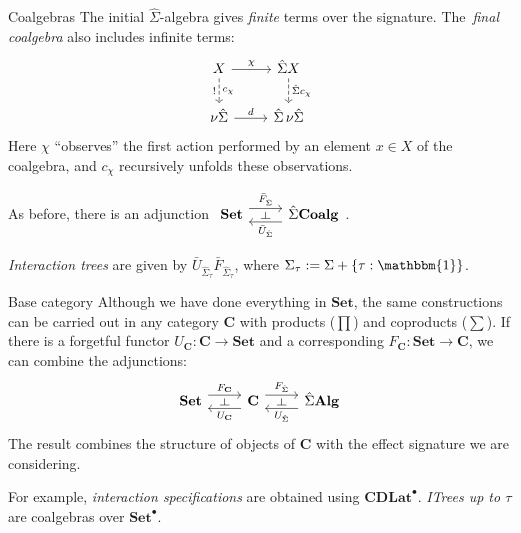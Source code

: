\documentclass{beamer}
\newcommand{\cat}[1]{\mathbf{#1}}
\begin{document}
\begin{frame}[fragile]{Coalgebras}
The initial $\hat{\Sigma}$-algebra
gives \emph{finite} terms over the signature.
The~\emph{final coalgebra} also includes infinite terms:
\[
  \begin{tikzcd}
    X \arrow[r, "\chi"] \arrow[d, "c_\chi", "!"', dashed] &
    \hat{\Sigma} X \arrow[d, "\hat{\Sigma} c_\chi", dashed] \\
    \nu \hat{\Sigma} \arrow[r, "d"] &
    \hat{\Sigma} \, \nu\hat{\Sigma}
  \end{tikzcd}
\]
Here $\chi$ ``observes'' the first action performed by
an element $x \in X$ of the coalgebra,
and $c_\chi$ recursively unfolds these observations.

As before, there is an adjunction
$\begin{tikzcd}
    \cat{Set}
    \arrow[r, "\bar{F}_{\hat{\Sigma}}" name=F, shift left=2] &
    \hat{\Sigma} \cat{Coalg}
    \arrow[l, "\bar{U}_{\hat{\Sigma}}" name=G, shift left=2]
    \arrow[phantom, from=F, to=G, "\dashv" rotate=-90]
  \end{tikzcd}$.

\emph{Interaction trees} are given by
$\bar{U}_{\hat{\Sigma}_\tau} \bar{F}_{\hat{\Sigma}_\tau}$,
where
$\Sigma_\tau := \Sigma + \{ \tau : \mathbbm{1} \}$.
\end{frame}

\begin{frame}[fragile]{Base category}
Although we have done everything in $\cat{Set}$,
the same constructions can be carried out in
any category $\cat{C}$ with products ($\prod$) and coproducts ($\sum$).
If there is a forgetful functor $U_\cat{C} : \cat{C} \rightarrow \cat{Set}$
and a corresponding $F_\cat{C} : \cat{Set} \rightarrow \cat{C}$,
we can combine the adjunctions:
\[
  \begin{tikzcd}
    \cat{Set}
    \arrow[r, "F_\cat{C}" name=F1, shift left=2] &
    \cat{C}
    \arrow[l, "U_\cat{C}" name=G1, shift left=2]
    \arrow[r, "F_{\hat{\Sigma}}" name=F, shift left=2] &
    \hat{\Sigma} \cat{Alg}
    \arrow[l, "U_{\hat{\Sigma}}" name=G, shift left=2]
    \arrow[phantom, from=F1, to=G1, "\dashv" rotate=-90]
    \arrow[phantom, from=F, to=G, "\dashv" rotate=-90]
  \end{tikzcd}
\]
The result combines the structure of objects of $\cat{C}$
with the effect signature we are considering.

For example,
\emph{interaction specifications}
are obtained using $\cat{CDLat}^\bullet$.
\emph{ITrees up to $\tau$}
are coalgebras over $\cat{Set}^\bullet$.
\end{frame}
\end{document}
